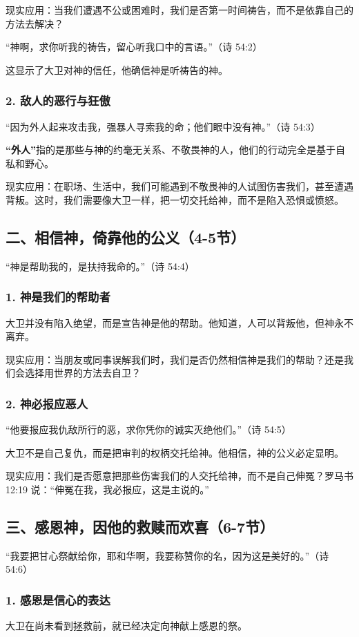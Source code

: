 \documentclass[a4paper, 12pt]{article}
\begin{document}
现实应用：当我们遭遇不公或困难时，我们是否第一时间祷告，而不是依靠自己的方法去解决？

\vspace{0.2cm}

“神啊，求你听我的祷告，留心听我口中的言语。”（诗 54:2）

这显示了大卫对神的信任，他确信神是听祷告的神。
\subsubsection*{2. 敌人的恶行与狂傲}
“因为外人起来攻击我，强暴人寻索我的命；他们眼中没有神。”（诗 54:3）

\textbf{“外人”}指的是那些与神的约毫无关系、不敬畏神的人，他们的行动完全是基于自私和野心。

现实应用：在职场、生活中，我们可能遇到不敬畏神的人试图伤害我们，甚至遭遇背叛。这时，我们需要像大卫一样，把一切交托给神，而不是陷入恐惧或愤怒。
\subsection*{二、相信神，倚靠他的公义（4-5节）}
“神是帮助我的，是扶持我命的。”（诗 54:4）

\subsubsection*{1. 神是我们的帮助者}
\hspace{0.6cm}大卫并没有陷入绝望，而是宣告神是他的帮助。他知道，人可以背叛他，但神永不离弃。

现实应用：当朋友或同事误解我们时，我们是否仍然相信神是我们的帮助？还是我们会选择用世界的方法去自卫？
\subsubsection*{2. 神必报应恶人}
“他要报应我仇敌所行的恶，求你凭你的诚实灭绝他们。”（诗 54:5）

大卫不是自己复仇，而是把审判的权柄交托给神。他相信，神的公义必定显明。

现实应用：我们是否愿意把那些伤害我们的人交托给神，而不是自己伸冤？罗马书 12:19 说：“伸冤在我，我必报应，这是主说的。”
\subsection*{三、感恩神，因他的救赎而欢喜（6-7节）}
“我要把甘心祭献给你，耶和华啊，我要称赞你的名，因为这是美好的。”（诗 54:6）

\subsubsection*{1. 感恩是信心的表达}
\hspace{0.6cm}大卫在尚未看到拯救前，就已经决定向神献上感恩的祭。
\end{document}
